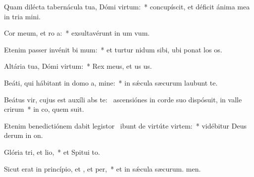 \item Quam dilécta tabernácula tua, Dómi virtum:~* concupíscit, et déficit ánima mea in tria mini.
\item Cor meum, et ro a:~* exsultavérunt in um vum.
\item Etenim passer invénit bi mum:~* et turtur nidum sibi, ubi ponat los os.
\item Altária tua, Dómi virtum:~* Rex meus, et us us.
\item Beáti, qui hábitant in domo a, mine:~* in sǽcula sæcurum laubunt te.
\item Beátus vir, cujus est auxíli abs te:~\pscross{} ascensiónes in corde suo dispósuit, in valle crirum~* in co, quem suit.
\item Etenim benedictiónem dabit legistor~\pscross{} ibunt de virtúte  virtem:~* vidébitur Deus derum in on.
\item Glória tri, et lio,~* et Spitui to.
\item Sicut erat in princípio, et , et per,~* et in sǽcula sæcurum. men.
